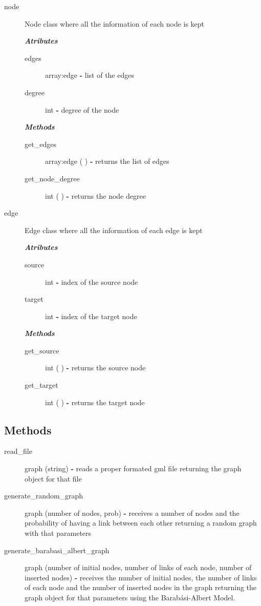 \documentclass[a4paper,titlepage,11pt]{article}
\begin{document}
\begin{description}
\item [node] Node class where all the information of each node is kept

\textit{ \textbf{Atributes} }
\begin{description}
\item [edges] array:edge \textbf{-} list of the edges
\item [degree] int \textbf{-} degree of the node
\end{description}

\textit{ \textbf{Methods} }
\begin{description}
\item [get\_edges] array:edge ( ) \textbf{-} returns the list of edges
\item [get\_node\_degree] int ( ) \textbf{-} returns the node degree
\end{description}

\item [edge] Edge class where all the information of each edge is kept

\textit{ \textbf{Atributes} }
\begin{description}
\item [source] int \textbf{-} index of the source node
\item [target] int \textbf{-} index of the target node
\end{description}

\textit{ \textbf{Methods} }
\begin{description}
\item [get\_source] int ( ) \textbf{-} returns the source node
\item [get\_target] int ( ) \textbf{-} returns the target node
\end{description}

\end{description}

\subsection*{Methods}
\begin{description}
\item [read\_file] graph (string) \textbf{-} reads a proper formated gml file returning the graph object for that file
\item [generate\_random\_graph] graph (number of nodes, prob) \textbf{-} receives a number of nodes and the probability of
                                                            having a link between each other returning a random graph with that parameters
\item [generate\_barabasi\_albert\_graph] graph (number of initial nodes, number of links of each node, number of inserted nodes) \textbf{-} receives
                                                            the number of initial nodes, the number of links of each node and the number of inserted
                                                            nodes in the graph returning the graph object for that parameters using the Barabási-Albert Model.
\end{description}
\end{document}
